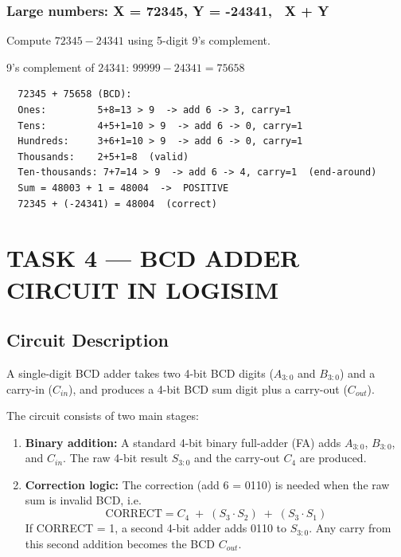 \documentclass[12pt,a4paper]{article}
\begin{document}
\subsubsection{Large numbers: X = 72345, Y = -24341, \ X + Y}

Compute $72345 - 24341$ using 5-digit 9's complement.

9's complement of $24341$: $99999 - 24341 = 75658$

\begin{verbatim}
  72345 + 75658 (BCD):
  Ones:         5+8=13 > 9  -> add 6 -> 3, carry=1
  Tens:         4+5+1=10 > 9  -> add 6 -> 0, carry=1
  Hundreds:     3+6+1=10 > 9  -> add 6 -> 0, carry=1
  Thousands:    2+5+1=8  (valid)
  Ten-thousands: 7+7=14 > 9  -> add 6 -> 4, carry=1  (end-around)
  Sum = 48003 + 1 = 48004  ->  POSITIVE
  72345 + (-24341) = 48004  (correct)
\end{verbatim}

\newpage
\section{TASK 4 --- BCD ADDER CIRCUIT IN LOGISIM}

\subsection{Circuit Description}

A single-digit BCD adder takes two 4-bit BCD digits ($A_{3:0}$ and $B_{3:0}$) and a
carry-in ($C_{in}$), and produces a 4-bit BCD sum digit plus a carry-out ($C_{out}$).

The circuit consists of two main stages:

\begin{enumerate}
    \item \textbf{Binary addition:} A standard 4-bit binary full-adder (FA) adds
    $A_{3:0}$, $B_{3:0}$, and $C_{in}$.  The raw 4-bit result $S_{3:0}$ and the
    carry-out $C_4$ are produced.
    \item \textbf{Correction logic:} The correction (add 6 = 0110) is needed when the
    raw sum is invalid BCD, i.e.\:
    \[
        \text{CORRECT} = C_4 \;+\; (S_3 \cdot S_2) \;+\; (S_3 \cdot S_1)
    \]
    If CORRECT = 1, a second 4-bit adder adds 0110 to $S_{3:0}$.  Any carry from this
    second addition becomes the BCD $C_{out}$.
\end{enumerate}
\end{document}
